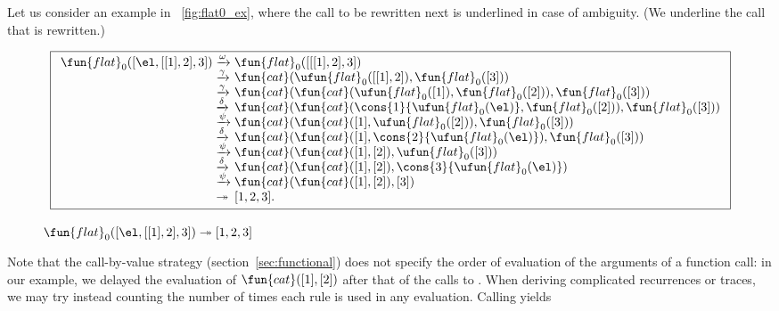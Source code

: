 Let us consider an example in \fig~\vref{fig:flat0_ex}, where the call
to be rewritten next is underlined in case of ambiguity. (We underline
the call that is rewritten.)
\begin{figure}[!b]
\begin{equation*}
\boxed{%
\begin{array}{r@{\;}l@{\;}l}
\fun{flat}_0([\el,[[1],2],3])
& \xrightarrow{\smash{\omega}}
& \fun{flat}_0([[[1],2],3])\\
& \xrightarrow{\smash{\gamma}}
& \fun{cat}(\ufun{flat}_0([[1],2]),\fun{flat}_0([3]))\\
& \xrightarrow{\smash{\gamma}}
& \fun{cat}(\fun{cat}(\ufun{flat}_0([1]),\fun{flat}_0([2])),\fun{flat}_0([3]))\\
& \xrightarrow{\smash{\delta}}
& \fun{cat}(\fun{cat}(\cons{1}{\ufun{flat}_0(\el)},\fun{flat}_0([2])),\fun{flat}_0([3]))\\
& \xrightarrow{\smash{\psi}}
& \fun{cat}(\fun{cat}([1],\ufun{flat}_0([2])),\fun{flat}_0([3]))\\
& \xrightarrow{\smash{\delta}}
& \fun{cat}(\fun{cat}([1],\cons{2}{\ufun{flat}_0(\el)}),\fun{flat}_0([3]))\\
& \xrightarrow{\smash{\psi}}
& \fun{cat}(\fun{cat}([1],[2]),\ufun{flat}_0([3]))\\
& \xrightarrow{\smash{\delta}}
& \fun{cat}(\fun{cat}([1],[2]),\cons{3}{\ufun{flat}_0(\el)})\\
& \xrightarrow{\smash{\psi}}
& \fun{cat}(\fun{cat}([1],[2]),[3])\\
& \twoheadrightarrow & [1,2,3].
\end{array}
}
\end{equation*}
\caption{\(\fun{flat}_0([\el,[[1],2],3]) \twoheadrightarrow [1,2,3]\)}
\label{fig:flat0_ex}
\end{figure}
Note that the call\hyp{}by\hyp{}value strategy (section~\ref{sec:functional}) does
not specify the order of evaluation of the arguments of a function
call: in our example, we delayed the evaluation of
\(\fun{cat}([1],[2])\)  after that of the
calls to . When
deriving complicated recurrences or traces, we may try instead
counting the number of times each rule is used in any
evaluation. Calling 
yields
